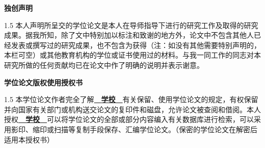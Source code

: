 \begin{titlepage}
	\vspace*{1.3cm}
	\begin{center}
	\fontsize{16pt}{\baselineskip}
	\textbf{独\quad 创\quad 声\quad 明}
	\end{center}
	\vspace*{24pt}
	\begin{spacing}{1.5}
	\fontsize{12pt}{\baselineskip}
	本人声明所呈交的学位论文是本人在导师指导下进行的研究工作及取得的研究成果。据我所知，除了文中特别加以标注和致谢的地方外，论文中不包含其他人已经发表或撰写过的研究成果，也不包含为获得\underline{\quad\quad\quad\quad\quad\quad\quad\quad}（注：如没有其他需要特别声明的，本栏可空）或其他教育机构的学位或证书使用过的材料。与我一同工作的同志对本研究所做的任何贡献均已在论文中作了明确的说明并表示谢意。
	\end{spacing}
	\vspace*{18pt}
	\noindent
	\hfill
	\vspace*{54pt}
	\begin{center}
	\fontsize{16pt}{\baselineskip}
	\textbf{学位论文版权使用授权书}
	\end{center}
	\vspace*{18pt}
	\begin{spacing}{1.5}
	\fontsize{12pt}{\baselineskip}
	本学位论文作者完全了解\underline{~~\textbf{学校}~~}有关保留、使用学位论文的规定，有权保留并向国家有关部门或机构送交论文的复印件和磁盘，允许论文被查阅和借阅。本人授权\underline{~~\textbf{学校}~~}可以将学位论文的全部或部分内容编入有关数据库进行检索，可以采用影印、缩印或扫描等复制手段保存、汇编学位论文。（保密的学位论文在解密后适用本授权书）
	\end{spacing}
	\vspace*{18pt}
	\noindent
	\hfill
	\vspace*{18pt}

	\noindent
	\hfill
	\vspace*{18pt}
	
\end{titlepage}
